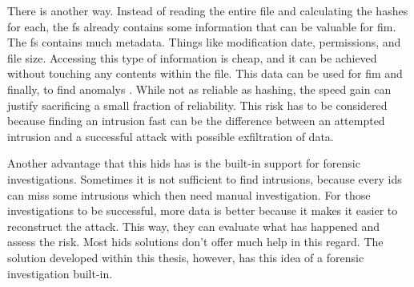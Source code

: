 There is another way. Instead of reading the entire file and calculating the hashes for each, the \gls{fs} already contains some information that can be valuable for \gls{fim}. The \gls{fs} contains much \gls{metadata}. Things like modification date, permissions, and file size. Accessing this type of information is cheap, and it can be achieved without touching any contents within the file. This data can be used for \gls{fim} and finally, to find \glspl{anomaly} \cite{inode}. While not as reliable as hashing, the speed gain can justify sacrificing a small fraction of reliability. This risk has to be considered because finding an \gls{intrusion} fast can be the difference between an attempted \gls{intrusion} and a successful attack with possible exfiltration of data. 

Another advantage that this \gls{hids} has is the built-in support for forensic investigations. Sometimes it is not sufficient to find \glspl{intrusion}, because every \gls{ids} can miss some \glspl{intrusion} which then need manual investigation. For those investigations to be successful, more data is better because it makes it easier to reconstruct the attack. This way, they can evaluate what has happened and assess the risk. Most \gls{hids} solutions don't offer much help in this regard. The solution developed within this thesis, however, has this idea of a forensic investigation built-in.

